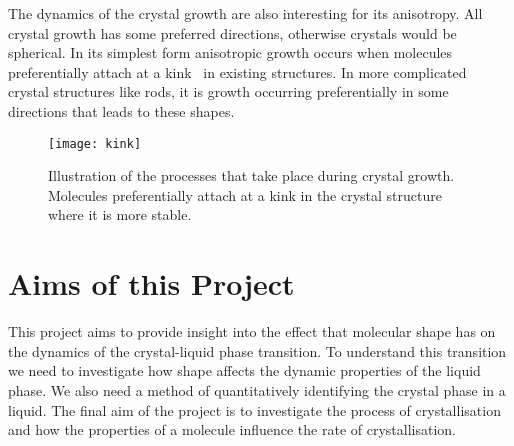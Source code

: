 The dynamics of the crystal growth are also interesting for its anisotropy. All crystal growth has some preferred directions, otherwise crystals would be spherical. In its simplest form anisotropic growth occurs when molecules preferentially attach at a kink~ in existing structures. In more complicated crystal structures like rods, it is growth occurring preferentially in some directions that leads to these shapes.

\begin{figure}
    \centering
    \texttt{[image: kink]}
    \caption{Illustration of the processes that take place during crystal growth. Molecules preferentially attach at a kink in the crystal structure where it is more stable.}
    \label{fig:kink}
\end{figure}

\section{Aims of this Project}

This project aims to provide insight into the effect that molecular shape has on the dynamics of the crystal-liquid phase transition. To understand this transition we need to investigate how shape affects the dynamic properties of the liquid phase. We also need a method of quantitatively identifying the crystal phase in a liquid. The final aim of the project is to investigate the process of crystallisation and how the properties of a molecule influence the rate of crystallisation.
